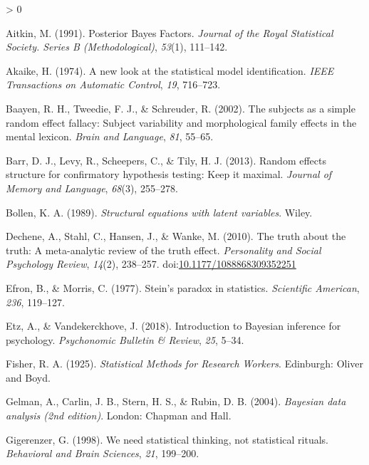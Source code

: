 \documentclass[
  english,
  ,man]{apa6}
\newlength{\cslhangindent}
\newenvironment{CSLReferences}[2] %
 {%
  \setlength{\parindent}{0pt}
  \ifodd #1 \everypar{\setlength{\hangindent}{\cslhangindent}}\ignorespaces\fi
  \ifnum #2 > 0
  \setlength{\parskip}{#2\baselineskip}
  \fi
 }%
 {}
\begin{document}
\hypertarget{refs}{}
\begin{CSLReferences}{1}{0}
\leavevmode\hypertarget{ref-Aitkin.1991}{}%
Aitkin, M. (1991). Posterior {Bayes Factors}. \emph{Journal of the Royal Statistical Society. Series B (Methodological)}, \emph{53}(1), 111--142.

\leavevmode\hypertarget{ref-Akaike.1974}{}%
Akaike, H. (1974). A new look at the statistical model identification. \emph{IEEE Transactions on Automatic Control}, \emph{19}, 716--723.

\leavevmode\hypertarget{ref-Baayen.etal.2002}{}%
Baayen, R. H., Tweedie, F. J., \& Schreuder, R. (2002). The subjects as a simple random effect fallacy: {Subject} variability and morphological family effects in the mental lexicon. \emph{Brain and Language}, \emph{81}, 55--65.

\leavevmode\hypertarget{ref-Barr.etal.2013}{}%
Barr, D. J., Levy, R., Scheepers, C., \& Tily, H. J. (2013). Random effects structure for confirmatory hypothesis testing: {Keep} it maximal. \emph{Journal of Memory and Language}, \emph{68}(3), 255--278.

\leavevmode\hypertarget{ref-Bollen.1989}{}%
Bollen, K. A. (1989). \emph{Structural equations with latent variables}. {Wiley}.

\leavevmode\hypertarget{ref-dechene2010}{}%
Dechene, A., Stahl, C., Hansen, J., \& Wanke, M. (2010). The truth about the truth: {A} meta-analytic review of the truth effect. \emph{Personality and Social Psychology Review}, \emph{14}(2), 238--257. doi:\href{https://doi.org/10.1177/1088868309352251}{10.1177/1088868309352251}

\leavevmode\hypertarget{ref-Efron.Morris.1977}{}%
Efron, B., \& Morris, C. (1977). Stein's paradox in statistics. \emph{Scientific American}, \emph{236}, 119--127.

\leavevmode\hypertarget{ref-Etz.Vandekerckhove.2018}{}%
Etz, A., \& Vandekerckhove, J. (2018). Introduction to {Bayesian} inference for psychology. \emph{Psychonomic Bulletin \& Review}, \emph{25}, 5--34.

\leavevmode\hypertarget{ref-Fisher.1925}{}%
Fisher, R. A. (1925). \emph{Statistical {Methods} for {Research Workers}}. {Edinburgh}: {Oliver and Boyd}.

\leavevmode\hypertarget{ref-Gelman.etal.2004}{}%
Gelman, A., Carlin, J. B., Stern, H. S., \& Rubin, D. B. (2004). \emph{Bayesian data analysis (2nd edition)}. {London}: {Chapman and Hall}.

\leavevmode\hypertarget{ref-Gigerenzer.1998}{}%
Gigerenzer, G. (1998). We need statistical thinking, not statistical rituals. \emph{Behavioral and Brain Sciences}, \emph{21}, 199--200.


\end{CSLReferences}
\end{document}
